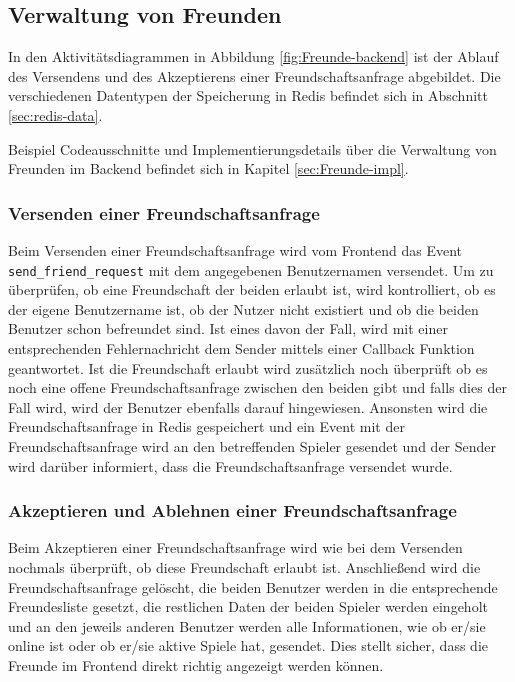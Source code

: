 \subsection{Verwaltung von Freunden}
\label{sec:hinzufügen-von-Freunden}
In den Aktivitätsdiagrammen in Abbildung \ref{fig:Freunde-backend} ist der Ablauf des Versendens und des Akzeptierens einer Freundschaftsanfrage abgebildet.
Die verschiedenen Datentypen der Speicherung in Redis befindet sich in Abschnitt \ref{sec:redis-data}.

Beispiel Codeausschnitte und Implementierungsdetails über die Verwaltung von Freunden im Backend befindet sich in Kapitel \ref{sec:Freunde-impl}.

\subsubsection{Versenden einer Freundschaftsanfrage}
Beim Versenden einer Freundschaftsanfrage wird vom Frontend das Event \linebreak \verb|send_friend_request| mit dem angegebenen Benutzernamen versendet. Um zu \linebreak überprüfen, ob eine Freundschaft der beiden erlaubt ist, wird kontrolliert, ob es der eigene Benutzername ist, ob der Nutzer nicht existiert und ob die beiden Benutzer schon befreundet sind. Ist eines davon der Fall, wird mit einer entsprechenden Fehlernachricht dem Sender mittels einer Callback Funktion geantwortet. 
Ist die Freundschaft erlaubt wird zusätzlich noch überprüft ob es noch eine offene Freundschaftsanfrage zwischen den beiden gibt und falls dies der Fall wird, wird der Benutzer ebenfalls darauf hingewiesen.
Ansonsten wird die Freundschaftsanfrage in Redis gespeichert und ein Event mit der Freundschaftsanfrage wird an den betreffenden Spieler gesendet und der Sender wird darüber informiert, dass die Freundschaftsanfrage versendet wurde.

\subsubsection{Akzeptieren und Ablehnen einer Freundschaftsanfrage}
\label{sec:accept-friend-request}
Beim Akzeptieren einer Freundschaftsanfrage wird wie bei dem Versenden nochmals überprüft, ob diese Freundschaft erlaubt ist. Anschließend wird die Freundschaftsanfrage gelöscht, die beiden Benutzer werden in die entsprechende Freundesliste gesetzt, die restlichen Daten der beiden Spieler werden eingeholt und an den jeweils anderen Benutzer werden alle Informationen, wie ob er/sie online ist oder ob er/sie aktive Spiele hat, gesendet. Dies stellt sicher, dass die Freunde im Frontend direkt richtig angezeigt werden können.

